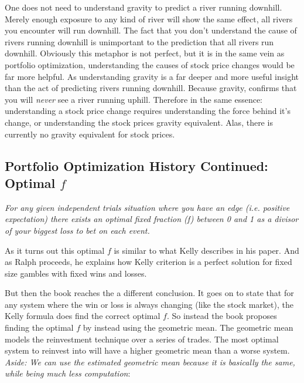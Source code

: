 \documentclass[11pt]{article}
\begin{document}
    One does not need to understand gravity to predict a river running downhill. Merely
    enough exposure to any kind of river will show the same effect, all rivers you
    encounter will run downhill. The fact that you don't understand the cause of rivers
    running downhill is unimportant to the prediction that all
    rivers run downhill. Obviously this metaphor is not perfect, but it is in the
    same vein as portfolio optimization, understanding the causes of stock price changes
    would be far more helpful. As understanding gravity is a far deeper and more useful
    insight than the act of predicting rivers running downhill. Because gravity, confirms
    that you will \textit{never} see a river running uphill. Therefore in the same
    essence: understanding a stock price change requires understanding the force behind
    it's change, or understanding the stock prices gravity equivalent. Alas, there is
    currently no gravity equivalent for stock prices.

\subsection{Portfolio Optimization History Continued: Optimal \(f\)}

    \begin{displayquote} \textit {
        For any given independent trials situation where you have an edge (i.e. positive 
        expectation) there exists an optimal fixed
        fraction (f) between 0 and 1 as a divisor of your biggest loss to bet on each event.
    } \end{displayquote}

    As it turns out this optimal \(f\) is similar to what Kelly describes in his paper. 
    And as Ralph proceeds, he explains how Kelly criterion is a perfect solution for 
    fixed size gambles with fixed wins and losses.

    But then the book reaches the a different conclusion. It goes on to state that for any system where 
    the win or loss is always changing {(like the stock market)}, the Kelly formula does find
    the correct optimal \(f\).
    So instead the book proposes finding the optimal \(f\) by instead using the geometric
    mean. The geometric mean models the reinvestment technique over a series of trades.
    The most optimal system to reinvest into will have a higher geometric mean than a
    worse system. \emph{Aside: We can use the estimated geometric mean because it is
    basically the same, while being much less computation}:
\end{document}

